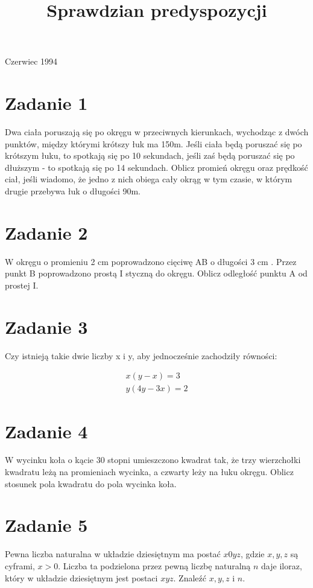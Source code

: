 \documentclass[10pt]{article}
\title{Sprawdzian predyspozycji }
\author{}
\date{}
\begin{document}
\maketitle
Czerwiec 1994

\section*{Zadanie 1}
Dwa ciała poruszają się po okręgu w przeciwnych kierunkach, wychodząc z dwóch punktów, między którymi krótszy łuk ma 150m. Jeśli ciała będą poruszać się po krótszym łuku, to spotkają się po 10 sekundach, jeśli zaś będą poruszać się po dłuższym - to spotkają się po 14 sekundach. Oblicz promień okręgu oraz prędkość ciał, jeśli wiadomo, że jedno z nich obiega cały okrąg w tym czasie, w którym drugie przebywa łuk o długości 90m.

\section*{Zadanie 2}
W okręgu o promieniu 2 cm poprowadzono cięciwę AB o długości 3 cm . Przez punkt B poprowadzono prostą I styczną do okręgu. Oblicz odległość punktu A od prostej I.

\section*{Zadanie 3}
Czy istnieją takie dwie liczby x i y, aby jednocześnie zachodziły równości:

\[
\begin{gathered}
x(y-x)=3 \\
y(4 y-3 x)=2
\end{gathered}
\]

\section*{Zadanie 4}
W wycinku koła o kącie 30 stopni umieszczono kwadrat tak, że trzy wierzchołki kwadratu leżą na promieniach wycinka, a czwarty leży na łuku okręgu. Oblicz stosunek pola kwadratu do pola wycinka koła.

\section*{Zadanie 5}
Pewna liczba naturalna w układzie dziesiętnym ma postać \(x 0 y z\), gdzie \(x, y, z\) są cyframi, \(x>0\). Liczba ta podzielona przez pewną liczbę naturalną \(n\) daje iloraz, który w układzie dziesiętnym jest postaci \(x y z\). Znaleźć \(x, y, z\) i \(n\).
\end{document}
